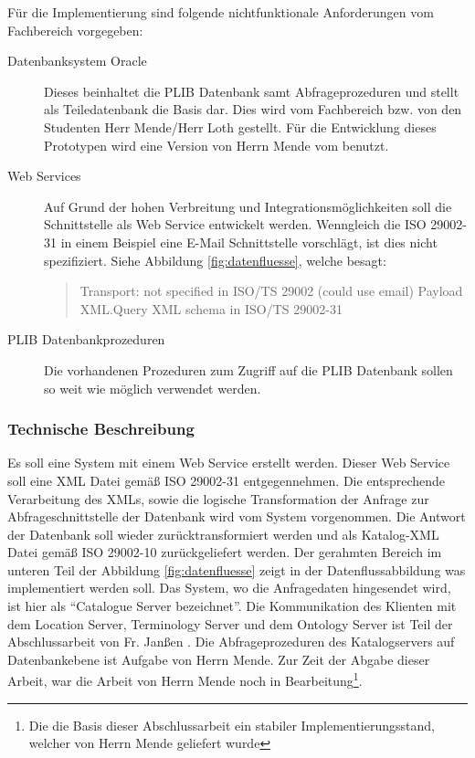 Für die Implementierung sind folgende nichtfunktionale Anforderungen vom Fachbereich vorgegeben:
\begin{description}
\item[Datenbanksystem Oracle] Dieses beinhaltet die PLIB Datenbank samt Abfrageprozeduren und stellt als Teiledatenbank die Basis dar. Dies wird vom Fachbereich bzw. von den Studenten Herr Mende/Herr Loth gestellt. Für die Entwicklung dieses Prototypen wird eine Version von Herrn Mende vom  benutzt.  
\item[Web Services] Auf Grund der hohen Verbreitung und Integrationsmöglichkeiten soll die Schnittstelle als Web Service entwickelt werden. Wenngleich die ISO 29002-31 in einem Beispiel eine E-Mail Schnittstelle vorschlägt, ist dies nicht spezifiziert. Siehe Abbildung \ref{fig:datenfluesse}, welche besagt:
\begin{quotation}
Transport: not specified in ISO/TS 29002 (could use email) Payload XML.Query XML schema in ISO/TS 29002-31
\end{quotation}
\item[PLIB Datenbankprozeduren] Die vorhandenen Prozeduren zum Zugriff auf die PLIB Datenbank sollen so weit wie möglich verwendet werden. 
\end{description}

\subsubsection{Technische Beschreibung}
Es soll eine System mit einem Web Service erstellt werden. Dieser Web Service soll eine XML Datei gemäß ISO 29002-31 entgegennehmen. Die entsprechende Verarbeitung des XMLs, sowie die logische Transformation der Anfrage zur Abfrageschnittstelle der Datenbank wird vom System vorgenommen. Die Antwort der Datenbank soll wieder zurücktransformiert werden und als Katalog-XML Datei gemäß ISO 29002-10 zurückgeliefert werden. 
Der gerahmten Bereich im unteren Teil der Abbildung \ref{fig:datenfluesse} zeigt in der Datenflussabbildung was implementiert werden soll. Das System, wo die Anfragedaten hingesendet wird, ist hier als \enquote{Catalogue Server bezeichnet}. 
Die Kommunikation des Klienten mit dem Location Server, Terminology Server und dem Ontology Server ist Teil der Abschlussarbeit von Fr. Janßen \citep[Vergl.][]{janssen}. 
Die Abfrageprozeduren des Katalogservers auf Datenbankebene ist Aufgabe von Herrn Mende. Zur Zeit der Abgabe dieser Arbeit, war die Arbeit von Herrn Mende noch in Bearbeitung\footnote{Die die Basis dieser Abschlussarbeit ein stabiler Implementierungsstand, welcher von Herrn Mende geliefert wurde}. 

